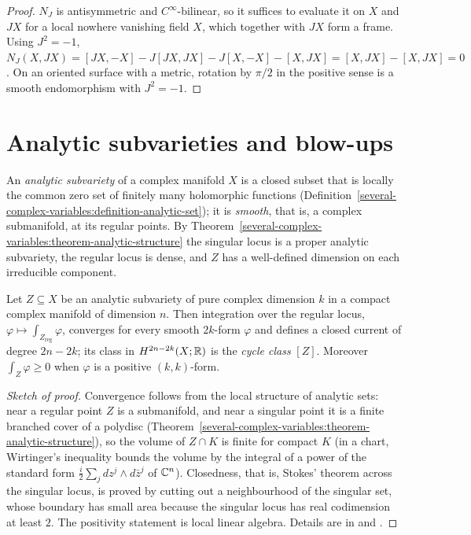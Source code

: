 \begin{proof}
$N_J$ is antisymmetric and $C^\infty$-bilinear, so it suffices to evaluate it on $X$ and $JX$ for a local nowhere vanishing field $X$, which together with $JX$ form a frame. Using $J^2 = -1$,
$N_J(X, JX) = [JX, -X] - J[JX, JX] - J[X, -X] - [X, JX] = [X, JX] - [X, JX] = 0$. On an oriented surface with a metric, rotation by $\pi/2$ in the positive sense is a smooth endomorphism with $J^2 = -1$.
\end{proof}

\section{Analytic subvarieties and blow-ups}\label{complex-manifolds:section-subvarieties}

\begin{definition}\label{complex-manifolds:definition-analytic-subvariety}
An \emph{analytic subvariety} of a complex manifold $X$ is a closed subset that is locally the common zero set of finitely many holomorphic functions (Definition~\ref{several-complex-variables:definition-analytic-set});
it is \emph{smooth}, that is, a complex submanifold, at its regular points. By Theorem~\ref{several-complex-variables:theorem-analytic-structure} the singular locus is a proper analytic subvariety, the regular
locus is dense, and $Z$ has a well-defined dimension on each irreducible component.
\end{definition}

\begin{proposition}\label{complex-manifolds:proposition-subvariety-class}
Let $Z \subseteq X$ be an analytic subvariety of pure complex dimension $k$ in a compact complex manifold of dimension $n$. Then integration over the regular locus,
$\varphi \mapsto \int_{Z_{\mathrm{reg}}}\varphi$, converges for every smooth $2k$-form $\varphi$ and defines a closed current of degree $2n - 2k$; its class in $H^{2n-2k}(X; \mathbb{R})$ is the \emph{cycle class} $[Z]$.
Moreover $\int_Z\varphi \geq 0$ when $\varphi$ is a positive $(k,k)$-form.
\end{proposition}

\begin{proof}[Sketch of proof]
Convergence follows from the local structure of analytic sets: near a regular point $Z$ is a submanifold, and near a singular point it is a finite branched cover of a polydisc
(Theorem~\ref{several-complex-variables:theorem-analytic-structure}), so the volume of $Z \cap K$ is finite for compact $K$ (in a chart, Wirtinger's inequality bounds the volume by the integral of a power of the
standard form $\frac{i}{2}\sum_jdz^j \wedge d\bar z^j$ of $\mathbb{C}^n$). Closedness, that is, Stokes' theorem across the singular locus, is proved by cutting out a neighbourhood of the singular set, whose boundary
has small area because the singular locus has real codimension at least $2$. The positivity statement is local linear algebra. Details are in \cite[Chapter 0, Section 2]{griffiths-harris} and
\cite[Chapter 11]{voisin-hodge-1}.
\end{proof}

